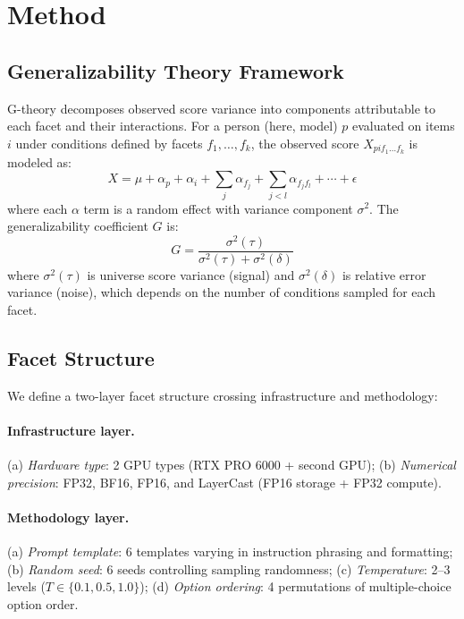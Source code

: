 \documentclass[letterpaper,11pt]{article}
\begin{document}
\section{Method}

\subsection{Generalizability Theory Framework}

G-theory decomposes observed score variance into components attributable to each facet and their interactions.
For a person (here, model) $p$ evaluated on items $i$ under conditions defined by facets $f_1, \ldots, f_k$, the observed score $X_{pi f_1 \ldots f_k}$ is modeled as:
\begin{equation}
X = \mu + \alpha_p + \alpha_i + \sum_j \alpha_{f_j} + \sum_{j<l} \alpha_{f_j f_l} + \cdots + \epsilon
\end{equation}
where each $\alpha$ term is a random effect with variance component $\sigma^2$.
The generalizability coefficient $G$ is:
\begin{equation}
G = \frac{\sigma^2(\tau)}{\sigma^2(\tau) + \sigma^2(\delta)}
\end{equation}
where $\sigma^2(\tau)$ is universe score variance (signal) and $\sigma^2(\delta)$ is relative error variance (noise), which depends on the number of conditions sampled for each facet.

\subsection{Facet Structure}

We define a two-layer facet structure crossing infrastructure and methodology:

\paragraph{Infrastructure layer.}
(a) \emph{Hardware type}: 2 GPU types (RTX PRO 6000 + second GPU);
(b) \emph{Numerical precision}: FP32, BF16, FP16, and LayerCast (FP16 storage + FP32 compute).

\paragraph{Methodology layer.}
(a) \emph{Prompt template}: 6 templates varying in instruction phrasing and formatting;
(b) \emph{Random seed}: 6 seeds controlling sampling randomness;
(c) \emph{Temperature}: 2--3 levels ($T \in \{0.1, 0.5, 1.0\}$);
(d) \emph{Option ordering}: 4 permutations of multiple-choice option order.
\end{document}
